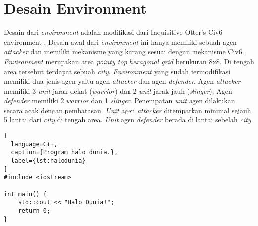\section{Desain Environment}
\label{sec:desainenvironment}

Desain dari \emph{environment} adalah modifikasi dari Inquisitive Otter's Civ6 environment \citep{civ6Environment}. 
Desain awal dari \emph{environment} ini hanya memiliki sebuah agen \emph{attacker} dan memiliki mekanisme yang kurang sesuai dengan mekanisme Civ6.
\emph{Environment} merupakan area \emph{pointy top hexagonal grid} berukuran 8x8. Di tengah area tersebut terdapat sebuah \emph{city}.
\emph{Environment} yang sudah termodifikasi memiliki dua jenis agen yaitu agen \emph{attacker} dan agen \emph{defender}.
Agen \emph{attacker} memiliki 3 \emph{unit} jarak dekat (\emph{warrior}) dan 2 \emph{unit} jarak jauh (\emph{slinger}).
Agen \emph{defender} memiliki 2 \emph{warrior} dan 1 \emph{slinger}.
Penempatan \emph{unit} agen dilakukan secara acak dengan pembatasan.
\emph{Unit} agen \emph{attacker} ditempatkan minimal sejauh 5 lantai dari \emph{city} di tengah area.
\emph{Unit} agen \emph{defender} berada di lantai sebelah \emph{city}.





\begin{lstlisting}[
  language=C++,
  caption={Program halo dunia.},
  label={lst:halodunia}
]
#include <iostream>

int main() {
    std::cout << "Halo Dunia!";
    return 0;
}
\end{lstlisting}

\lipsum[2-3]



\lipsum[4]
